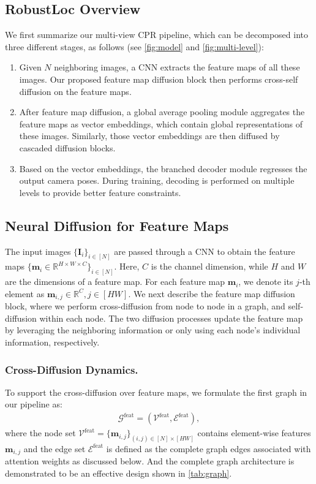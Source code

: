 \documentclass[letterpaper]{article} \usepackage{aaai23}  \usepackage{times}  \usepackage{helvet}  \usepackage{courier}  \usepackage[hyphens]{url}  \usepackage{graphicx} \urlstyle{rm} \def\UrlFont{\rm}  \usepackage{natbib}  \usepackage{caption} \frenchspacing  \setlength{\pdfpagewidth}{8.5in} \setlength{\pdfpageheight}{11in} \usepackage{booktabs}
\theoremstyle{remark}
\theoremstyle{plain}
\newcommand{\mbI}{\bm{I}}
\newcommand{\mbm}{\bm{m}}
\begin{document}
\subsection{RobustLoc Overview}
We first summarize our multi-view CPR pipeline, which can be decomposed into three different stages, as follows (see \cref{fig:model} and \cref{fig:multi-level}): 
\begin{enumerate}
\item Given $N$ neighboring images, a CNN extracts the feature maps of all these images. Our proposed feature map diffusion block then performs cross-self diffusion on the feature maps.
\item After feature map diffusion, a global average pooling module aggregates the feature maps as vector embeddings, which contain global representations of these images. Similarly, those vector embeddings are then diffused by cascaded diffusion blocks. 
\item Based on the vector embeddings, the branched decoder module regresses the output camera poses. During training, decoding is performed on multiple levels to provide better feature constraints.
\end{enumerate}




\subsection{Neural Diffusion for Feature Maps}
 The input images $\{\mbI_{i}\}_{i\in [N]}$ are passed through a CNN to obtain the feature maps $ \{\mbm_{i} \in \mathbb{R}^{H \times W \times C } \}_{i\in [N]}$. Here, $C$ is the channel dimension, while $H$ and $W$ are the dimensions of a feature map. For each feature map $\mbm_i$, we denote its $j$-th element as $\mbm_{i,j}\in \mathbb{R}^{C} , j\in [HW]$. We next describe the feature map diffusion block, where we perform cross-diffusion from node to node in a graph, and self-diffusion within each node. The two diffusion processes update the feature map by leveraging the neighboring information or only using each node's individual information, respectively.
\subsubsection{Cross-Diffusion Dynamics.}
To support the cross-diffusion over feature maps, we formulate the first graph in our pipeline as:
\begin{align}
\mathcal{G}^{\mathrm{feat}}=(\mathcal{V}^{\mathrm{feat}}, \mathcal{E}^{\mathrm{feat}}), 
\end{align}
where the node set $\mathcal{V}^{\mathrm{\mathrm{feat}}}=\{\mbm_{i,j}\}_{(i,j)\in [N]\times[HW]}$ contains element-wise features $\mbm_{i,j}$ and the edge set $\mathcal{E}^{\mathrm{\mathrm{feat}}}$ is defined as the complete graph edges associated with attention weights as discussed below. And the complete graph architecture is demonstrated to be an effective design shown in \cref{tab:graph}.
\end{document}
